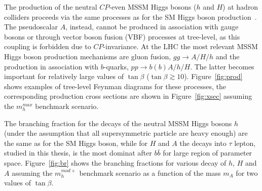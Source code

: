 The production of the neutral $CP$-even MSSM Higgs bosons ($h$ and $H$) at hadron
colliders proceeds via the same processes as for the SM Higgs
boson production~\cite{LHCxsec1}. The pseudoscalar $A$, instead, cannot be produced
in association with gauge bosons or through  vector boson fusion (VBF) processes at
tree-level, as this coupling is forbidden due to $CP$-invariance.  At
the LHC  the most relevant  MSSM Higgs boson production mechanisms 
are gluon fusion, $gg\rightarrow A/H/h$ and the production in association with $b$-quarks, $pp \rightarrow b(b)A/h/H$.
The latter becomes important for relatively large values of $\tan\beta$ ($\tan\beta \apprge 10$). 
Figure~\ref{fig:prod} shows examples of tree-level  Feynman diagrams for these processes, 
the corresponding production cross sections are shown in Figure~\ref{fig:xsec}  assuming the $m_h^{max}$ benchmark scenario.


The branching fraction for the decays of the neutral
MSSM Higgs bosons $h$ (under the assumption that all supersymmetric particle
are heavy enough) are the same as for the SM Higgs boson, while for $H$ and $A$ the decays into $\tau$ lepton, studied in this thesis, 
is the most dominat after $b\bar{b}$ for large region of parameter space.
Figure~\ref{fig:br} shows the  branching fractions for various decay of $h$, $H$ and $A$ 
assuming the  $m_h^{mod+}$ benchmark scenario as a  function of the mass $m_A$ for two values of $\tan \beta$. 


